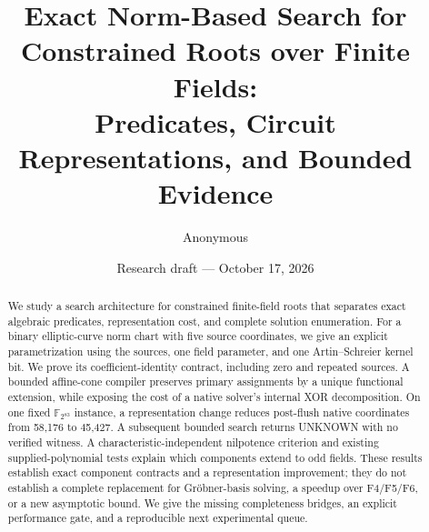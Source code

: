 \documentclass[11pt]{article}
\title{Exact Norm-Based Search for Constrained Roots over Finite Fields:\\
Predicates, Circuit Representations, and Bounded Evidence}
\author{Anonymous}
\date{Research draft --- October 17, 2026}
\newcommand{\F}{\mathbb F}
\begin{document}
\maketitle
\begin{abstract}
We study a search architecture for constrained finite-field roots that separates
exact algebraic predicates, representation cost, and complete solution enumeration.
For a binary elliptic-curve norm chart with five source coordinates, we give an
explicit parametrization using the sources, one field parameter, and one
Artin--Schreier kernel bit. We prove its coefficient-identity contract, including
zero and repeated sources. A bounded affine-cone compiler preserves primary
assignments by a unique functional extension, while exposing the cost of a native
solver's internal XOR decomposition. On one fixed $\F_{2^{83}}$ instance, a
representation change reduces post-flush native coordinates from 58,176 to
45,427. A subsequent bounded search returns UNKNOWN with no verified witness.
A characteristic-independent nilpotence criterion and existing supplied-polynomial
tests explain which components extend to odd fields. These results establish
exact component contracts and a representation improvement; they do not establish
a complete replacement for Gr\"obner-basis solving, a speedup over F4/F5/F6, or a
new asymptotic bound. We give the missing completeness bridges, an explicit
performance gate, and a reproducible next experimental queue.
\end{abstract}







\appendix

\end{document}
